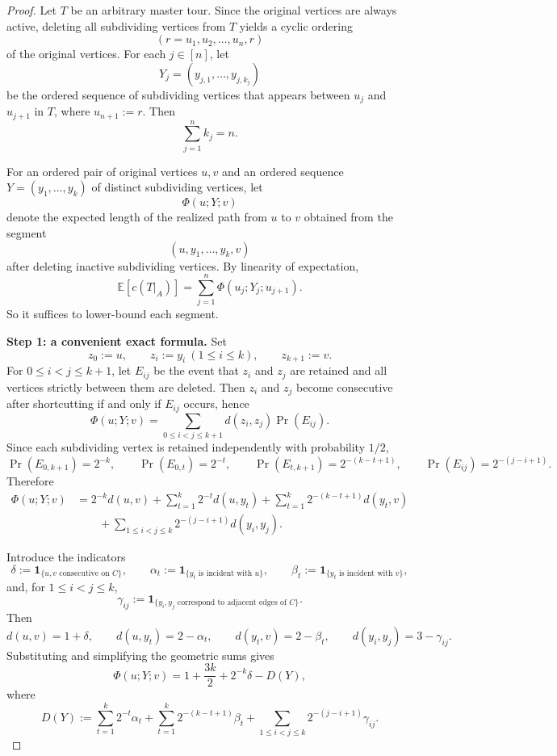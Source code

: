 \documentclass[11pt]{amsart}
\newcommand{\E}{\mathbb{E}}
\begin{document}
\begin{proof}
Let $T$ be an arbitrary master tour. Since the original vertices are always active, deleting all subdividing vertices from $T$ yields a cyclic ordering
\[
(r=u_1,u_2,\dots,u_n,r)
\]
of the original vertices. For each $j\in[n]$, let
\[
Y_j=(y_{j,1},\dots,y_{j,k_j})
\]
be the ordered sequence of subdividing vertices that appears between $u_j$ and $u_{j+1}$ in $T$, where $u_{n+1}:=r$. Then
\[
\sum_{j=1}^n k_j=n.
\]

For an ordered pair of original vertices $u,v$ and an ordered sequence $Y=(y_1,\dots,y_k)$ of distinct subdividing vertices, let
\[
\Phi(u;Y;v)
\]
denote the expected length of the realized path from $u$ to $v$ obtained from the segment
\[
(u,y_1,\dots,y_k,v)
\]
after deleting inactive subdividing vertices. By linearity of expectation,
\[
\E[c(T|_A)]
=
\sum_{j=1}^n \Phi(u_j;Y_j;u_{j+1}).
\]
So it suffices to lower-bound each segment.

\medskip
\noindent\textbf{Step 1: a convenient exact formula.}
Set
\[
z_0:=u,\qquad z_i:=y_i\ (1\le i\le k),\qquad z_{k+1}:=v.
\]
For $0\le i<j\le k+1$, let $E_{ij}$ be the event that $z_i$ and $z_j$ are retained and all vertices strictly between them are deleted. Then $z_i$ and $z_j$ become consecutive after shortcutting if and only if $E_{ij}$ occurs, hence
\[
\Phi(u;Y;v)=\sum_{0\le i<j\le k+1} d(z_i,z_j)\Pr(E_{ij}).
\]
Since each subdividing vertex is retained independently with probability $1/2$,
\[
\Pr(E_{0,k+1})=2^{-k},\qquad
\Pr(E_{0,t})=2^{-t},\qquad
\Pr(E_{t,k+1})=2^{-(k-t+1)},\qquad
\Pr(E_{ij})=2^{-(j-i+1)}.
\]
Therefore
\begin{align*}
\Phi(u;Y;v)
&=
2^{-k}d(u,v)
+\sum_{t=1}^k 2^{-t}d(u,y_t)
+\sum_{t=1}^k 2^{-(k-t+1)}d(y_t,v) \\
&\qquad
+\sum_{1\le i<j\le k}2^{-(j-i+1)}d(y_i,y_j).
\end{align*}

Introduce the indicators
\[
\delta:=\mathbf 1_{\{u,v\text{ consecutive on }C\}},
\qquad
\alpha_t:=\mathbf 1_{\{y_t\text{ is incident with }u\}},
\qquad
\beta_t:=\mathbf 1_{\{y_t\text{ is incident with }v\}},
\]
and, for $1\le i<j\le k$,
\[
\gamma_{ij}:=\mathbf 1_{\{y_i,y_j\text{ correspond to adjacent edges of }C\}}.
\]
Then
\[
d(u,v)=1+\delta,
\qquad
 d(u,y_t)=2-\alpha_t,
\qquad
 d(y_t,v)=2-\beta_t,
\qquad
 d(y_i,y_j)=3-\gamma_{ij}.
\]
Substituting and simplifying the geometric sums gives
\[
\Phi(u;Y;v)=1+\frac{3k}{2}+2^{-k}\delta-D(Y),
\]
where
\[
D(Y):=
\sum_{t=1}^k 2^{-t}\alpha_t
+\sum_{t=1}^k 2^{-(k-t+1)}\beta_t
+\sum_{1\le i<j\le k}2^{-(j-i+1)}\gamma_{ij}.
\]


\end{proof}
\end{document}
